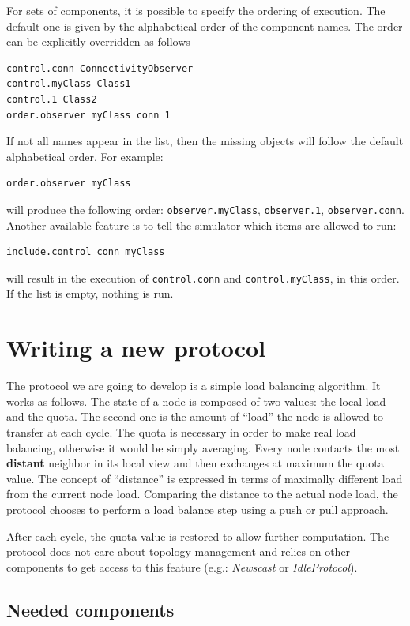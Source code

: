 \documentclass[a4paper,11pt]{article}
\begin{document}
For sets of components,
it is possible to specify the ordering of execution. The default one is given
by the alphabetical order of the component names.
The order can be explicitly overridden as follows
\begin{verbatim}
control.conn ConnectivityObserver
control.myClass Class1
control.1 Class2
order.observer myClass conn 1
\end{verbatim}
If not all names appear in the list,
then the missing objects will follow the default alphabetical order.
For example:
\begin{verbatim}
order.observer myClass
\end{verbatim}
will produce the following order:
\texttt{observer.myClass}, \texttt{observer.1},
\texttt{observer.conn}.
Another available feature is to tell the simulator which items are
allowed to run:
\begin{verbatim}
include.control conn myClass
\end{verbatim}
will result in the execution of \texttt{control.conn} and
\texttt{control.myClass}, in this order.
If the list is empty, nothing is run.

\section{Writing a new protocol}

The protocol we are going to develop is a simple load balancing algorithm.
It works as follows. The state of a node is composed of two values:
the local load and the quota. The second one is the amount of ``load''
the node is allowed to transfer at each cycle. The quota is necessary
in order to make real load balancing, otherwise it would be simply
averaging. Every node contacts the most \textbf{distant} neighbor
in its local view and then exchanges at maximum the quota value. The
concept of ``distance'' is expressed in terms of maximally
different load from the current node load. Comparing the distance
to the actual node load, the protocol chooses to perform a load balance
step using a push or pull approach.

After each cycle, the quota value is restored to allow further computation.
The protocol does not care about topology management and relies on
other components to get access to this feature (e.g.: \emph{Newscast} or
\emph{IdleProtocol}). 


\subsection{Needed components}
\end{document}
